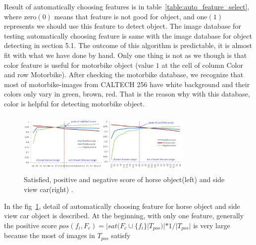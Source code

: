 Result of automatically choosing features is in table~\ref{table:auto_feature_select}, where
zero$(0)$ means that feature is not good for object, and one$(1)$
represents we should use this feature to detect object. The image
database for testing automatically choosing feature is same with the
image database for object detecting in section 5.1. The outcome of
this algorithm is predictable, it is almost fit with what we have done
by hand. Only one thing is not as we though is that color feature is
useful for motorbike object (value $1$ at the cell of column Color and
row Motorbike). After checking the motorbike database, we
recognize that most of motorbike-images from CALTECH 256 have
white background and their colors only vary in green, brown, red.
That is the reason why with this database, color is helpful for
detecting motorbike object.
\begin{figure}[ht]
  \centering
  \includegraphics[width=3.35in,height=1.2in]{images/auto_selection.pdf}
  \caption{Satisfied, positive and negative score of horse object(left) and side view car(right) .}
  \label{fig:auto_selection}
\end{figure}
In the fig~\ref{fig:auto_selection}, detail of automatically choosing feature for
horse object and side view car object is described. 
At the beginning, with only one feature, generally the positive score $ pos(f_i,F_c) = |sat(F_c \cup \{f_i\}|T_{pos})| * 1/|T_{pos}|$  is very large because the most of images in $T_{pos}$ satisfy
